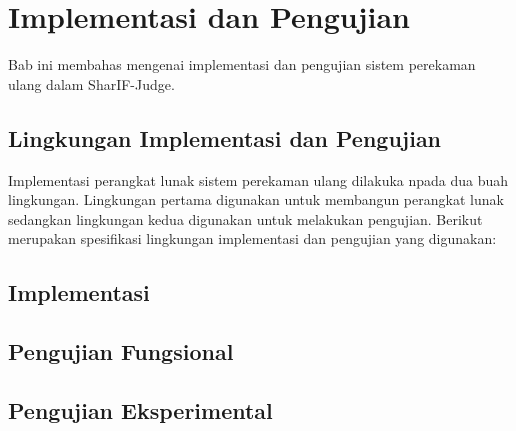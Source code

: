\chapter{Implementasi dan Pengujian}
\label{chap:implementasidanpengujian}

Bab ini membahas mengenai implementasi dan pengujian sistem perekaman ulang dalam SharIF-Judge.

\section{Lingkungan Implementasi dan Pengujian}
\label{sec:5:lingkungan}

Implementasi perangkat lunak sistem perekaman ulang dilakuka npada dua buah lingkungan. Lingkungan pertama digunakan untuk membangun perangkat lunak sedangkan lingkungan kedua digunakan untuk melakukan pengujian. Berikut merupakan spesifikasi lingkungan implementasi dan pengujian yang digunakan:


\section{Implementasi}
\label{sec:5:implementasi}

\section{Pengujian Fungsional}
\label{sec:5:fungsional}

\section{Pengujian Eksperimental}
\label{sec:5:eksperimental}